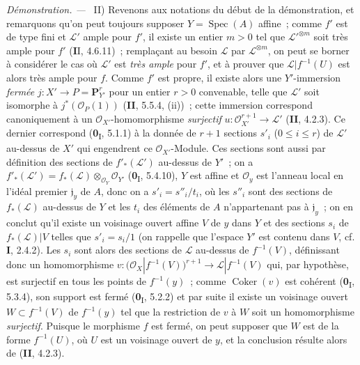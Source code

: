 \documentclass[10pt,oneside]{book}
\newcommand{\oldpage}[2][]{%
  \setcounter{footnote}{0}%
  \marginpar{\scriptsize\textbf{#1}~|~#2}\ignorespaces}
\newenvironment{proof}{%
  \par\medskip\noindent\textit{Démonstration. ---\ }}{\par}
\begin{document}
\begin{proof}
\noindent II) Revenons aux notations du début de la démonstration,
et remarquons qu'on
\oldpage[III]{146}
peut toujours supposer $Y=\operatorname{Spec}(A)$
affine~; comme $f'$ est de type fini et $\mathcal L'$ ample pour $f'$, il
existe un entier $m>0$ tel que $\mathcal L'^{\otimes m}$ soit très ample pour
$f'$ (\textbf{I}I, 4.6.11)~; remplaçant au besoin $\mathcal L$ par
$\mathcal L^{\otimes m}$, on peut se borner à considérer le cas où
$\mathcal L'$ est \emph{très ample} pour $f'$, et à prouver que
$\mathcal L|f^{-1}(U)$ est alors très ample pour $f$. Comme $f'$ est propre,
il existe alors une $Y'$-immersion \emph{fermée}
$j:X'\to P=\mathbf P_{Y'}^r$ pour un entier $r>0$ convenable, telle que
$\mathcal L'$ soit isomorphe à $j^*(\mathcal O_P(1))$ (\textbf{II}, 5.5.4, (ii))~;
cette immersion correspond canoniquement à un $\mathcal O_{X'}$-homomorphisme
\emph{surjectif}
$u:\mathcal O_{X'}^{r+1}\longrightarrow\mathcal L'$
(\textbf{II}, 4.2.3). Ce dernier correspond (\textbf{0}\textsubscript{I}, 5.1.1) à la donnée
de $r+1$ sections $s'_i$ ($0\leq i\leq r$) de $\mathcal L'$ au-dessus de
$X'$ qui engendrent ce $\mathcal O_{X'}$-Module. Ces sections sont aussi par
définition des sections de $f'_*(\mathcal L')$ au-dessus de $Y'$~; on a
$f'_*(\mathcal L')=f_*(\mathcal L)\otimes_{\mathcal O_Y}\mathcal O_{Y'}$
(\textbf{0}\textsubscript{I}, 5.4.10), $Y$ est affine et $\mathcal O_y$ est l'anneau
local en l'idéal premier $\mathfrak j_y$ de $A$, donc on a
$s'_i=s''_i/t_i$, où les $s''_i$ sont des sections de $f_*(\mathcal L)$
au-dessus de $Y$ et les $t_i$ des éléments de $A$ n'appartenant pas à
$\mathfrak j_y$~; on en conclut qu'il existe un voisinage ouvert affine $V$
de $y$ dans $Y$ et des sections $s_i$ de $f_*(\mathcal L)|V$ telles que
$s'_i=s_i/1$ (on rappelle que l'espace $Y'$ est contenu dans $V$, cf. \textbf{I},
2.4.2). Les $s_i$ sont alors des sections de $\mathcal L$ au-dessus de
$f^{-1}(V)$, définissant donc un homomorphisme
$v:\bigl(\mathcal O_X|f^{-1}(V)\bigr)^{r+1}
\longrightarrow\mathcal L|f^{-1}(V)$
qui, par hypothèse, est surjectif en tous les points de $f^{-1}(y)$~; comme
$\operatorname{Coker}(v)$ est cohérent (\textbf{0}\textsubscript{I}, 5.3.4), son
support est fermé (\textbf{0}\textsubscript{I}, 5.2.2) et par suite il existe un
voisinage ouvert $W\subset f^{-1}(V)$ de $f^{-1}(y)$ tel que la restriction
de $v$ à $W$ soit un homomorphisme \emph{surjectif}. Puisque le morphisme $f$ est
fermé, on peut supposer que $W$ est de la forme $f^{-1}(U)$, où $U$ est un
voisinage ouvert de $y$, et la conclusion résulte alors de (\textbf{II}, 4.2.3).
\end{proof}
\end{document}
